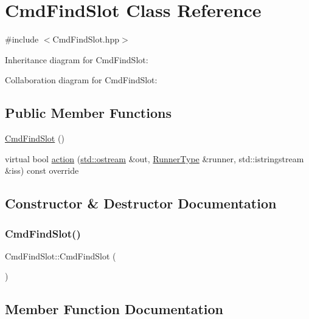 \hypertarget{classCmdFindSlot}{}\section{Cmd\+Find\+Slot Class Reference}
\label{classCmdFindSlot}


{\ttfamily \#include $<$Cmd\+Find\+Slot.\+hpp$>$}



Inheritance diagram for Cmd\+Find\+Slot\+:


Collaboration diagram for Cmd\+Find\+Slot\+:
\subsection*{Public Member Functions}
\begin{DoxyCompactItemize}
\item 
\hyperlink{classCmdFindSlot_af8c13df1c27a1bf09c19fbef05ef3a2f}{Cmd\+Find\+Slot} ()
\item 
virtual bool \hyperlink{classCmdFindSlot_a01d81fa82fa98c28d353bf7ea28a2afe}{action} (\hyperlink{doctest_8h_a116af65cb5e924b33ad9d9ecd7a783f3}{std\+::ostream} \&out, \hyperlink{Command_8hpp_ad45c3de597c2023a8be0399d914161f4}{Runner\+Type} \&runner, std\+::istringstream \&iss) const override
\end{DoxyCompactItemize}


\subsection{Constructor \& Destructor Documentation}
\mbox{\label{classCmdFindSlot_af8c13df1c27a1bf09c19fbef05ef3a2f}} 
\subsubsection{\texorpdfstring{Cmd\+Find\+Slot()}{CmdFindSlot()}}
{\footnotesize\ttfamily Cmd\+Find\+Slot\+::\+Cmd\+Find\+Slot (\begin{DoxyParamCaption}{ }\end{DoxyParamCaption})}



\subsection{Member Function Documentation}
\mbox{\label{classCmdFindSlot_a01d81fa82fa98c28d353bf7ea28a2afe}} 
